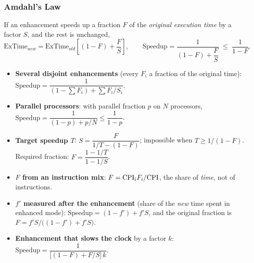 \subsubsection{Amdahl's Law}
\begin{theorem}
If an enhancement speeds up a fraction $F$ of the \emph{original execution
time} by a factor $S$, and the rest is unchanged,
\[
  \text{ExTime}_{new}=\text{ExTime}_{old}\left[(1-F)+\frac FS\right],\qquad
  \text{Speedup}=\frac{1}{(1-F)+\dfrac FS}\;\le\;\frac{1}{1-F}.
\]
\end{theorem}
\begin{itemize}[leftmargin=*]
  \item \textbf{Several disjoint enhancements} (every $F_i$ a fraction of the
  original time):
  $\text{Speedup}=\dfrac{1}{(1-\sum F_i)+\sum F_i/S_i}$.
  \item \textbf{Parallel processors}: with parallel fraction $p$ on $N$
  processors, $\text{Speedup}=\dfrac{1}{(1-p)+p/N}\le\dfrac1{1-p}$.
  \item \textbf{Target speedup $T$}: $S=\dfrac{F}{1/T-(1-F)}$; impossible when
  $T\ge1/(1-F)$. Required fraction: $F=\dfrac{1-1/T}{1-1/S}$.
  \item \textbf{$F$ from an instruction mix}: $F=\mathrm{CPI}_i F_i/\mathrm{CPI}$, the share of
  \emph{time}, not of instructions.
  \item \textbf{$f'$ measured after the enhancement} (share of the \emph{new}
  time spent in enhanced mode): $\text{Speedup}=(1-f')+f'S$, and the original
  fraction is $F=f'S/\big((1-f')+f'S\big)$.
  \item \textbf{Enhancement that slows the clock} by a factor $k$:
  $\text{Speedup}=\dfrac{1}{\big[(1-F)+F/S\big]\,k}$.
\end{itemize}

